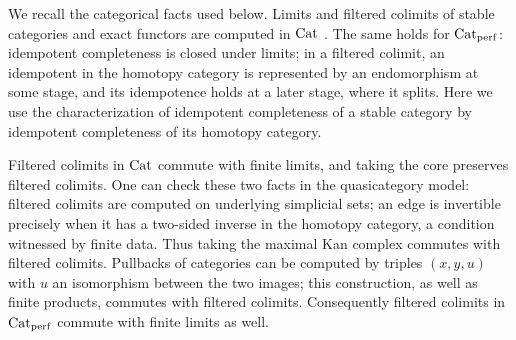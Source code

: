 	We recall the categorical facts used below. Limits and filtered colimits of stable categories and exact functors are computed in ${\textup{Cat}}$ \cite[Theorem~1.1.4.4 and Proposition~1.1.4.6]{lurie2016HA}. The same holds for ${\textup{Cat}}_{\operatorname{perf}}$: idempotent completeness is closed under limits; in a filtered colimit, an idempotent in the homotopy category is represented by an endomorphism at some stage, and its idempotence holds at a later stage, where it splits. Here we use the characterization of idempotent completeness of a stable category by idempotent completeness of its homotopy category.

	Filtered colimits in ${\textup{Cat}}$ commute with finite limits, and taking the core preserves filtered colimits. One can check these two facts in the quasicategory model: filtered colimits are computed on underlying simplicial sets; an edge is invertible precisely when it has a two-sided inverse in the homotopy category, a condition witnessed by finite data. Thus taking the maximal Kan complex commutes with filtered colimits. Pullbacks of categories can be computed by triples $(x,y,u)$ with $u$ an isomorphism between the two images; this construction, as well as finite products, commutes with filtered colimits. Consequently filtered colimits in ${\textup{Cat}}_{\operatorname{perf}}$ commute with finite limits as well.

